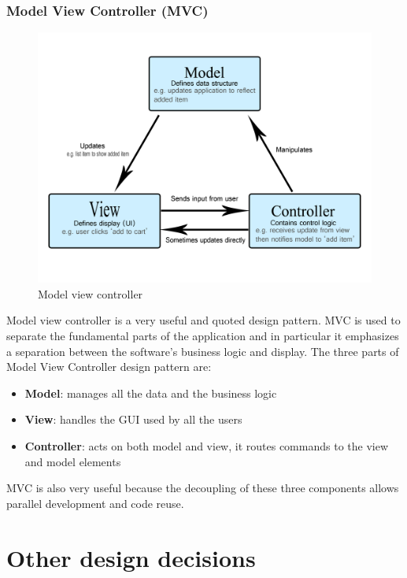             \subsubsection*{Model View Controller (MVC)}
            \begin{figure}[H]
                \includegraphics[scale=0.9]{dd/resources/images/MVC.png}
                \caption{Model view controller}        
            \end{figure}
            Model view controller is a very useful and quoted design pattern.
            MVC is used to separate the fundamental parts of the application and
            in particular it  emphasizes a separation between the software’s
            business logic and display. The three parts of Model View Controller
            design pattern are:
            \begin{itemize}
                \item \textbf{Model}: manages all the data and the business
                logic
                \item \textbf{View}: handles the GUI used by all the users
                \item \textbf{Controller}: acts on both model and view, it
                routes commands to the view and model elements  
            \end{itemize}    
            MVC is also very useful because the decoupling of these three
            components allows parallel development and code reuse.
    \section{Other design decisions}
